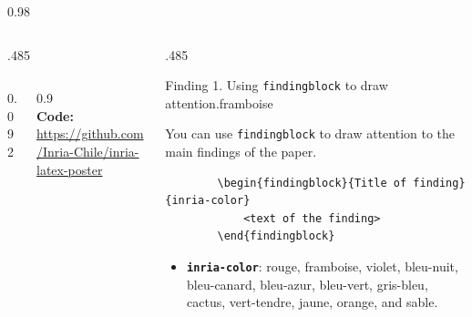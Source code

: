 \documentclass[final,svgnames,english]{beamer}
\begin{document}
\begin{frame}[fragile]{}
\begin{columns}[T]
\begin{column}{0.98\linewidth}
\begin{columns}[T]
\begin{column}{.485\linewidth}
    \begin{plainblock}{}
    \begin{columns}[c]
        \begin{column}{0.092\textwidth}
        \end{column}
        \begin{column}{0.9\textwidth}%
            {\linespread{0.83}\footnotesize{}\\[-1.28ex]
            \textbf{Code:} \url{https://github.com/Inria-Chile/inria-latex-poster}}
        \end{column}
    \end{columns}
    \end{plainblock}
\end{column}

\begin{column}{.485\linewidth}
    \begin{plainblock}{}
        \begin{findingblock}{Finding 1. Using \texttt{findingblock} to draw attention.}{framboise}
        
        You can use \texttt{findingblock} to draw attention to the main findings of the paper.
        \begin{verbatim}
        \begin{findingblock}{Title of finding}{inria-color}
            <text of the finding>
        \end{findingblock}
        \end{verbatim}
        \begin{itemize}
                \item \textbf{\texttt{inria-color}}: rouge, framboise, violet, bleu-nuit, bleu-canard, bleu-azur, bleu-vert, gris-bleu, cactus, vert-tendre, jaune, orange, and sable.
        \end{itemize}
        \end{findingblock}
        

\end{plainblock}
\end{column}
\end{columns}
\end{column}
\end{columns}
\end{frame}
\end{document}
